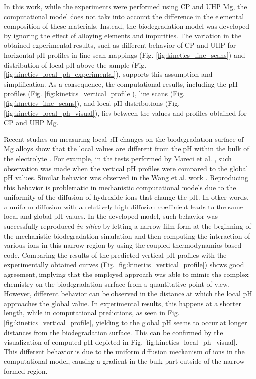In this work, while the experiments were performed using \gls{CP} and \gls{UHP} Mg, the computational model does not take into account the difference in the elemental composition of these materials. Instead, the biodegradation model was developed by ignoring the effect of alloying elements and impurities. The variation in the obtained experimental results, such as different behavior of \gls{CP} and \gls{UHP} for horizontal pH profiles in line scan mappings (Fig. \ref{fig:kinetics_line_scans}) and distribution of local pH above the sample (Fig. \ref{fig:kinetics_local_ph_experimental}), supports this assumption and simplification. As a consequence, the computational results, including the pH profiles (Fig. \ref{fig:kinetics_vertical_profile}), line scans (Fig. \ref{fig:kinetics_line_scans}), and local pH distributions (Fig. \ref{fig:kinetics_local_ph_visual}), lies between the values and profiles obtained for \gls{CP} and \gls{UHP} Mg.

Recent studies on measuring local pH changes on the biodegradation surface of Mg alloys show that the local values are different from the pH within the bulk of the electrolyte \cite{Gonzalez2021}. For example, in the tests performed by Mareci et al. \cite{Mareci2016}, such observation was made when the vertical pH profiles were compared to the global pH values. Similar behavior was observed in the Wang et al. work \cite{Wang2022}. Reproducing this behavior is problematic in mechanistic computational models due to the uniformity of the diffusion of hydroxide ions that change the pH. In other words, a uniform diffusion with a relatively high diffusion coefficient leads to the same local and global pH values. In the developed model, such behavior was successfully reproduced \textit{in silico} by letting a narrow film form at the beginning of the mechanistic biodegradation simulation and then computing the interaction of various ions in this narrow region by using the coupled thermodynamics-based code. Comparing the results of the predicted vertical pH profiles with the experimentally obtained curves (Fig. \ref{fig:kinetics_vertical_profile}) shows good agreement, implying that the employed approach was able to mimic the complex chemistry on the biodegradation surface from a quantitative point of view. However, different behavior can be observed in the distance at which the local pH approaches the global value. In experimental results, this happens at a shorter length, while in computational predictions, as seen in Fig. \ref{fig:kinetics_vertical_profile}, yielding to the global pH seems to occur at longer distances from the biodegradation surface. This can be confirmed by the visualization of computed pH depicted in Fig. \ref{fig:kinetics_local_ph_visual}. This different behavior is due to the uniform diffusion mechanism of ions in the computational model, causing a gradient in the bulk part outside of the narrow formed region.

